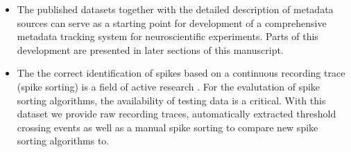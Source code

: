 \begin{itemize}
 \item The published datasets together with the detailed description of metadata sources can serve as a starting point for development of a comprehensive metadata tracking system for neuroscientific experiments. Parts of this development are presented in later sections of this manuscript.
 \item The the correct identification of spikes based on a continuous recording trace (spike sorting) is a field of active research \citep{Rey_2015, Lefebvre_2016, Sukiban_2019}. For the evalutation of spike sorting algorithms, the availability of testing data is a critical. With this dataset we provide raw recording traces, automatically extracted threshold crossing events as well as a manual spike sorting to compare new spike sorting algorithms to.
\end{itemize}








